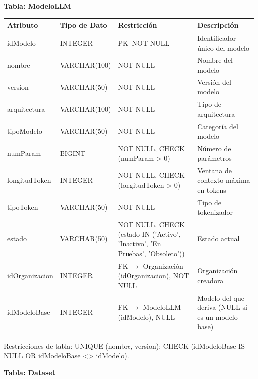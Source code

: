 \documentclass[12pt,a4paper]{article}
\begin{document}
\textbf{Tabla: ModeloLLM}

\begin{longtable}{|>{\raggedright\arraybackslash}p{3.45cm}|>{\raggedright\arraybackslash}p{3.45cm}|>{\raggedright\arraybackslash}p{3.45cm}|>{\raggedright\arraybackslash}p{3.45cm}|}
\hline
\textbf{Atributo} & \textbf{Tipo de Dato} & \textbf{Restricción} & \textbf{Descripción} \\
\hline
idModelo & INTEGER & PK, NOT NULL & Identificador único del modelo \\
\hline
nombre & VARCHAR(100) & NOT NULL & Nombre del modelo \\
\hline
version & VARCHAR(50) & NOT NULL & Versión del modelo \\
\hline
arquitectura & VARCHAR(100) & NOT NULL & Tipo de arquitectura \\
\hline
tipoModelo & VARCHAR(50) & NOT NULL & Categoría del modelo \\
\hline
numParam & BIGINT & NOT NULL, CHECK (numParam > 0) & Número de parámetros \\
\hline
longitudToken & INTEGER & NOT NULL, CHECK (longitudToken > 0) & Ventana de contexto máxima en tokens \\
\hline
tipoToken & VARCHAR(50) & NOT NULL & Tipo de tokenizador \\
\hline
estado & VARCHAR(50) & NOT NULL, CHECK (estado IN ('Activo', 'Inactivo', 'En Pruebas', 'Obsoleto')) & Estado actual \\
\hline
idOrganizacion & INTEGER & FK $\rightarrow$ Organización (idOrganizacion), NOT NULL & Organización creadora \\
\hline
idModeloBase & INTEGER & FK $\rightarrow$ ModeloLLM (idModelo), NULL & Modelo del que deriva (NULL si es un modelo base) \\
\hline
\end{longtable}

Restricciones de tabla: UNIQUE (nombre, version); CHECK (idModeloBase IS NULL OR idModeloBase <> idModelo).

\textbf{Tabla: Dataset}
\end{document}
